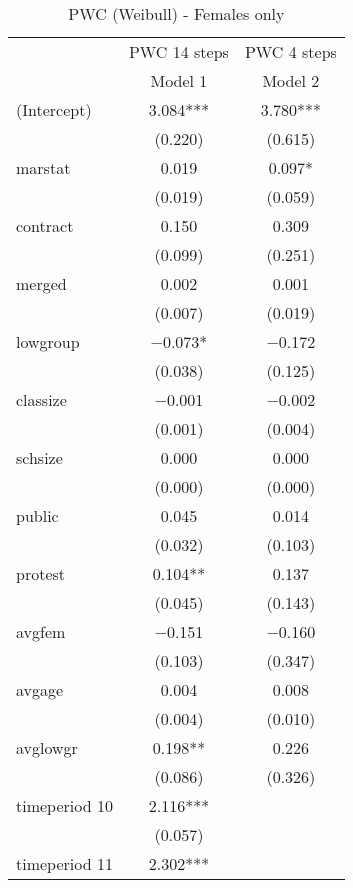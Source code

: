 \documentclass[
]{article}
\begin{document}
\begin{table}[!h]

\caption{\label{tab:unnamed-chunk-21}PWC (Weibull) - Females only}
\centering
\fontsize{7}{9}\selectfont
\begin{tabular}[t]{lcc}
\toprule
\multicolumn{1}{c}{ } & \multicolumn{1}{c}{PWC 14 steps} & \multicolumn{1}{c}{PWC 4 steps} \\
\cmidrule(l{3pt}r{3pt}){2-2} \cmidrule(l{3pt}r{3pt}){3-3}
  & Model 1 & Model 2\\
\midrule
(Intercept) & \num{3.084}*** & \num{3.780}***\\
 & (\num{0.220}) & (\num{0.615})\\
marstat & \num{0.019} & \num{0.097}*\\
 & (\num{0.019}) & (\num{0.059})\\
contract & \num{0.150} & \num{0.309}\\
 & (\num{0.099}) & (\num{0.251})\\
merged & \num{0.002} & \num{0.001}\\
 & (\num{0.007}) & (\num{0.019})\\
lowgroup & \num{-0.073}* & \num{-0.172}\\
 & (\num{0.038}) & (\num{0.125})\\
classize & \num{-0.001} & \num{-0.002}\\
 & (\num{0.001}) & (\num{0.004})\\
schsize & \num{0.000} & \num{0.000}\\
 & (\num{0.000}) & (\num{0.000})\\
public & \num{0.045} & \num{0.014}\\
 & (\num{0.032}) & (\num{0.103})\\
protest & \num{0.104}** & \num{0.137}\\
 & (\num{0.045}) & (\num{0.143})\\
avgfem & \num{-0.151} & \num{-0.160}\\
 & (\num{0.103}) & (\num{0.347})\\
avgage & \num{0.004} & \num{0.008}\\
 & (\num{0.004}) & (\num{0.010})\\
avglowgr & \num{0.198}** & \num{0.226}\\
 & (\num{0.086}) & (\num{0.326})\\
timeperiod 10 & \num{2.116}*** & \\
 & (\num{0.057}) & \\
timeperiod 11 & \num{2.302}*** & \\

\end{tabular}
\end{table}
\end{document}
